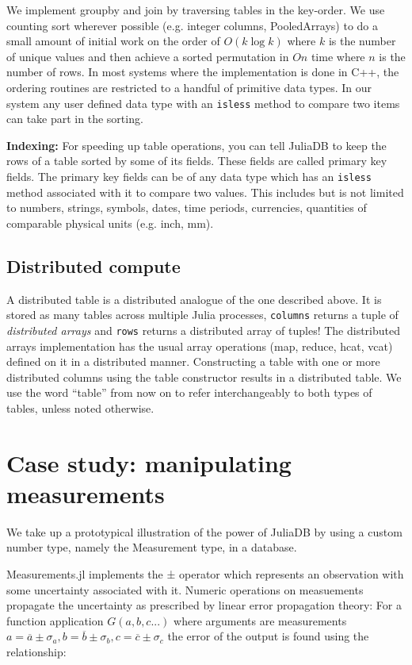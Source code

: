 \documentclass{juliacon}
\begin{document}
We implement groupby and join by traversing tables in the key-order. We use counting sort wherever possible (e.g. integer columns, PooledArrays) to do a small amount of initial work on the order of $O(k \log k)$ where $k$ is the number of unique values and then achieve a sorted permutation in $O n$ time where $n$ is the number of rows. In most systems where the implementation is done in C++, the ordering routines are restricted to a handful of primitive data types. In our system any user defined data type with an \texttt{isless} method to compare two items can take part in the sorting.

\textbf{Indexing: }For speeding up table operations, you can tell
JuliaDB to keep the rows of a table sorted by some of its fields.
These fields are called primary key fields. The primary key fields
can be of any data type which has an \texttt{isless} method associated
with it to compare two values. This includes but is not limited to
numbers, strings, symbols, dates, time periods, currencies, quantities
of comparable physical units (e.g. inch, mm).

\subsection{Distributed compute}

A distributed table is a distributed analogue of the one described
above. It is stored as many tables across multiple Julia processes,
\texttt{columns} returns a tuple of \emph{distributed arrays} and
\texttt{rows} returns a distributed array of tuples! The distributed
arrays implementation has the usual array operations (map, reduce,
hcat, vcat) defined on it in a distributed manner. Constructing a
table with one or more distributed columns using the table constructor
results in a distributed table. We use the word ``table'' from now on to refer interchangeably to both types of tables, unless
noted otherwise.

\section{Case study: manipulating measurements}
\label{sec:measurements}

We take up a prototypical illustration of the power of JuliaDB by using a custom number type, namely the Measurement type, in a database.

Measurements.jl implements the ± operator which represents an observation with some uncertainty associated with it. Numeric operations on measuements propagate the uncertainty as prescribed by linear error propagation theory: For a function application $G(a,b,c...)$ where arguments are measurements $a=\overline{a} \pm \sigma_{a}, b=\overline{b} \pm \sigma_{b}, c=\overline{c} \pm \sigma_{c}$ the error of the output is found using the relationship: 
\end{document}
